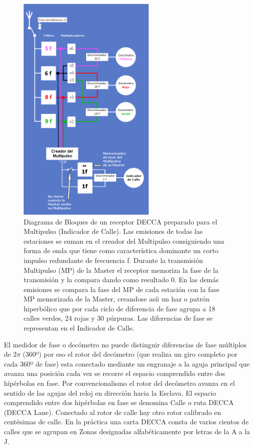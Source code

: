 \begin{figure}[!htb]
  \centering
  \includegraphics[width=0.6\textwidth]{Imagenes/06.01.adf/receptor_decca_multipulso.gif}  
  \caption{Diagrama de Bloques de un receptor DECCA preparado para el Multipulso (Indicador de Calle). Las emisiones de todas las estaciones se suman en el creador del Multipulso consiguiendo una forma de onda que tiene como caracter\'istica dominante un corto impulso redundante de frecuencia f. Durante la transmisi\'on Multipulso (MP) de la Master el receptor memoriza la fase de la transmisi\'on y la compara dando como resultado 0. En las dem\'as emisiones se compara la fase del MP de cada estaci\'on con la fase MP memorizada de la Master, creandose as\'ii un haz o patr\'on hiperb\'olico que por cada ciclo de diferencia de fase agrupa a 18 calles verdes, 24 rojas y 30 p\'urpuras. Las diferencias de fase se representan en el Indicador de Calle.}
  \label{fig:receptor-decca-multipulso}
\end{figure}

El medidor de fase o dec\'ometro no puede distinguir diferencias de fase m\'ultiplos de $2\pi$ (360º) por eso el rotor del dec\'ometro (que realiza un giro completo por cada 360º de fase) esta conectado mediante un engranaje a la aguja principal que avanza una posici\'on cada vez se recorre el espacio comprendido entre dos hip\'erbolas en fase. Por convencionalismo el rotor del dec\'ometro avanza en el sentido de las agujas del reloj en direcci\'on hacia la Esclava. El espacio comprendido entre dos hip\'erbolas en fase se denomina Calle o ruta DECCA (DECCA Lane). Conectado al rotor de calle hay otro rotor calibrado en cent\'esimas de calle. En la pr\'actica una carta DECCA consta de varios cientos de calles que se agrupan en Zonas designadas alfab\'eticamente por letras de la A a la J.


